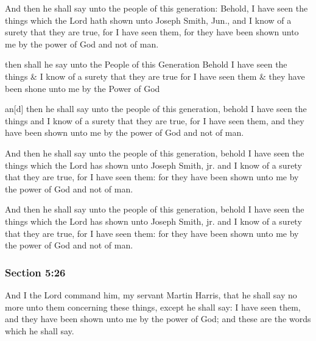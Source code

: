 		And then he shall say unto the people of this generation: Behold, I have seen the things which the Lord hath shown unto Joseph Smith, Jun., and I know of a surety that they are true, for I have seen them, for they have been shown unto me by the power of God and not of man.

		\begin{framed}
		\scriptsize
			\begin{compactdesc}
				\item[JSP] then shall he say unto the People of this Generation Behold I have seen the things \& I know of a surety that they are true for I have seen them \& they have been shone unto me by the Power of God
				\item[RB1] [\textit{missing}]
				\item[BC] an[d] then he shall say unto the people of this generation, behold I have seen the things and I know of a surety that they are true, for I have seen them, and they have been shown unto me by the power of God and not of man.
				\item[DC 1835] And then he shall say unto the people of this generation, behold I have seen the things which the Lord has shown unto Joseph Smith, jr. and I know of a surety that they are true, for I have seen them: for they have been shown unto me by the power of God and not of man.
				\item[DC 1844] And then he shall say unto the people of this generation, behold I have seen the things which the Lord has shown unto Joseph Smith, jr. and I know of a surety that they are true, for I have seen them: for they have been shown unto me by the power of God and not of man.
			\end{compactdesc}
		\end{framed}

	\subsubsection{Section 5:26} %
		\label{DC5-26}

		And I the Lord command him, my servant Martin Harris, that he shall say no more unto them concerning these things, except he shall say: I have seen them, and they have been shown unto me by the power of God; and these are the words which he shall say.

